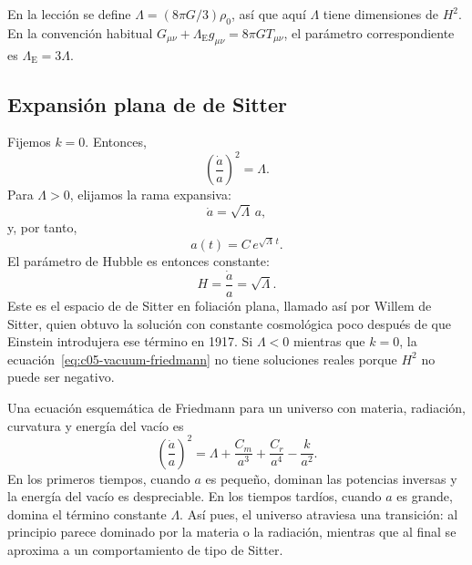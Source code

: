 \begin{remark}
En la lección se define \(\Lambda=(8\pi G/3)\rho_0\), así que aquí \(\Lambda\) tiene dimensiones de \(H^2\). En la convención habitual \(G_{\mu\nu}+\Lambda_{\mathrm E}g_{\mu\nu}=8\pi G T_{\mu\nu}\), el parámetro correspondiente es \(\Lambda_{\mathrm E}=3\Lambda\).
\end{remark}

\subsection{Expansión plana de de Sitter}

Fijemos \(k=0\). Entonces,
\begin{equation}
\left(\frac{\dot a}{a}\right)^2=\Lambda.
\end{equation}
Para \(\Lambda>0\), elijamos la rama expansiva:
\begin{equation}
\dot a=\sqrt{\Lambda}\,a,
\end{equation}
y, por tanto,
\begin{equation}
a(t)=C\,e^{\sqrt{\Lambda}\,t}.
\end{equation}
El parámetro de Hubble es entonces constante:
\begin{equation}
H=\frac{\dot a}{a}=\sqrt{\Lambda}.
\end{equation}
Este es el espacio de de Sitter en foliación plana, llamado así por Willem de Sitter, quien obtuvo la solución con constante cosmológica poco después de que Einstein introdujera ese término en 1917. Si \(\Lambda<0\) mientras que \(k=0\), la ecuación~\eqref{eq:c05-vacuum-friedmann} no tiene soluciones reales porque \(H^2\) no puede ser negativo.

\begin{classroomqa}
\end{classroomqa}

Una ecuación esquemática de Friedmann para un universo con materia, radiación, curvatura y energía del vacío es
\begin{equation}
\left(\frac{\dot a}{a}\right)^2
=
\Lambda+\frac{C_m}{a^3}+\frac{C_r}{a^4}-\frac{k}{a^2}.
\label{eq:c05-mixed-friedmann}
\end{equation}
En los primeros tiempos, cuando \(a\) es pequeño, dominan las potencias inversas y la energía del vacío es despreciable. En los tiempos tardíos, cuando \(a\) es grande, domina el término constante \(\Lambda\). Así pues, el universo atraviesa una transición: al principio parece dominado por la materia o la radiación, mientras que al final se aproxima a un comportamiento de tipo de Sitter.

